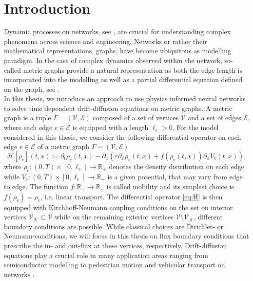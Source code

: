 \chapter{Introduction}

Dynamic processes on networks, see \cite{newman2018networks}, are crucial for understanding complex phenomena across science and engineering. Networks or rather their mathematical representations, graphs, have become ubiquitous as modelling paradigm. In the case of complex dynamics observed within the network, so-called metric graphs provide a natural representation as both the edge length is incorporated into the modelling as well as a partial differential equation defined on the graph, see \cite{BerkolaikoKuchment:2013}. \\
In this thesis, we introduce an approach to use physics informed neural networks to solve time dependent drift-diffusion equations on metric graphs. A metric graph is a tuple $\Gamma = \left(\mathcal{V},\mathcal{E}\right)$ composed of a set of vertices $\mathcal{V}$ and a set of edges $\mathcal{E}$, where each edge $e \in \mathcal{E}$ is equipped with a length $\ell_e>0$. For the model considered in this thesis, we consider the following differential operator on each edge $e \in \mathcal{E}$ of a metric graph $\Gamma = \left(\mathcal{V},\mathcal{E}\right)$
\begin{equation} 
    \label{eq:H}
    \mathcal{H} [\rho_e]  \left( t,x \right)  \coloneqq \partial_t \rho_e  \left( t,x \right)   - \partial_x  \left( \varepsilon \partial_x \rho_e  \left( t,x \right)  + f \left( \rho_e  \left( t,x \right)   \right)  \partial_x V_e  \left( t,x \right)  \right) ,
\end{equation}
where $\rho_e \colon  \left( 0, T \right)  \times \left[ 0, \ell_e \right] \to \mathbb{R}_{+}$ denotes the density distribution on each edge while $V_e \colon  \left( 0,T \right)  \times \left[ 0, \ell_e \right] \to \mathbb{R}_{+}$ is a given potential, that may vary from edge to edge. The function $f \colon \mathbb{R}_{+} \to \mathbb{R}_{+}$ is called mobility and its simplest choice is $f\left(\rho_e\right) = \rho_e$, i.e. linear transport. The differential operator \cref{eq:H} is then equipped with Kirchhoff-Neumann coupling conditions on the set on interior vertices $\mathcal{V}_\mathcal{K} \subset \mathcal{V}$ while on the remaining exterior vertices $\mathcal{V} \setminus \mathcal{V}_\mathcal{K}$, different boundary conditions are possible. While classical choices are Dirichlet- or Neumann-conditions, we will focus in this thesis on flux boundary conditions that prescribe the in- and out-flux at these vertices, respectively. Drift-diffusion equations play a crucial role in many application areas ranging from semiconductor modelling \cite{natalini1996bipolar} to pedestrian motion \cite{hughes2002continuum} and vehicular transport on networks \cite{burger2018derivation,tordeux2018traffic}. \\
